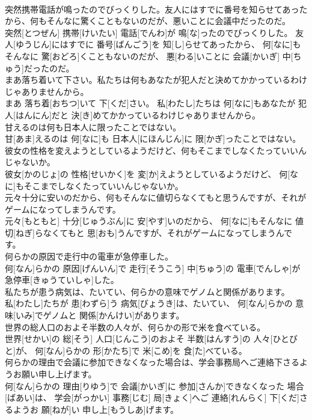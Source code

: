 \documentclass[8pt]{extreport}
\begin{document}
\begin{CJK}{UTF8}{min}
\\	突然携帯電話が鳴ったのでびっくりした。友人にはすでに番号を知らせてあったから、何もそんなに驚くこともないのだが、悪いことに会議中だったのだ。	
\\	突然[とつぜん] 携帯[けいたい] 電話[でんわ]が 鳴[な]ったのでびっくりした。 友人[ゆうじん]にはすでに 番号[ばんごう]を 知[し]らせてあったから、 何[なに]もそんなに 驚[おどろ]くこともないのだが、 悪[わる]いことに 会議[かいぎ] 中[ちゅう]だったのだ。
\\	まあ落ち着いて下さい。私たちは何もあなたが犯人だと決めてかかっているわけじゃありませんから。	
\\	まあ 落ち着[おちつ]いて 下[くだ]さい。 私[わたし]たちは 何[なに]もあなたが 犯人[はんにん]だと 決[き]めてかかっているわけじゃありませんから。
\\	甘えるのは何も日本人に限ったことではない。	
\\	甘[あま]えるのは 何[なに]も 日本人[にほんじん]に 限[かぎ]ったことではない。
\\	彼女の性格を変えようとしているようだけど、何もそこまでしなくたっていいんじゃないか。	
\\	彼女[かのじょ]の 性格[せいかく]を 変[か]えようとしているようだけど、 何[なに]もそこまでしなくたっていいんじゃないか。
\\	元々十分に安いのだから、何もそんなに値切らなくてもと思うんですが、それがゲームになってしまうんです。	
\\	元々[もともと] 十分[じゅうぶん]に 安[やす]いのだから、 何[なに]もそんなに 値切[ねぎ]らなくてもと 思[おも]うんですが、それがゲームになってしまうんです。
\\	何らかの原因で走行中の電車が急停車した。	
\\	何[なん]らかの 原因[げんいん]で 走行[そうこう] 中[ちゅう]の 電車[でんしゃ]が 急停車[きゅうていしゃ]した。
\\	私たちが患う病気は、たいてい、何らかの意味でゲノムと関係があります。	
\\	私[わたし]たちが 患[わずら]う 病気[びょうき]は、たいてい、 何[なん]らかの 意味[いみ]でゲノムと 関係[かんけい]があります。
\\	世界の総人口のおよそ半数の人々が、何らかの形で米を食べている。	
\\	世界[せかい]の 総[そう] 人口[じんこう]のおよそ 半数[はんすう]の 人々[ひとびと]が、 何[なん]らかの 形[かたち]で 米[こめ]を 食[た]べている。
\\	何らかの理由で会議に参加できなくなった場合は、学会事務局へご連絡下さるようお願い申し上げます。	
\\	何[なん]らかの 理由[りゆう]で 会議[かいぎ]に 参加[さんか]できなくなった 場合[ばあい]は、 学会[がっかい] 事務[じむ] 局[きょく]へご 連絡[れんらく] 下[くだ]さるようお 願[ねが]い 申し上[もうしあ]げます。

\end{CJK}
\end{document}
